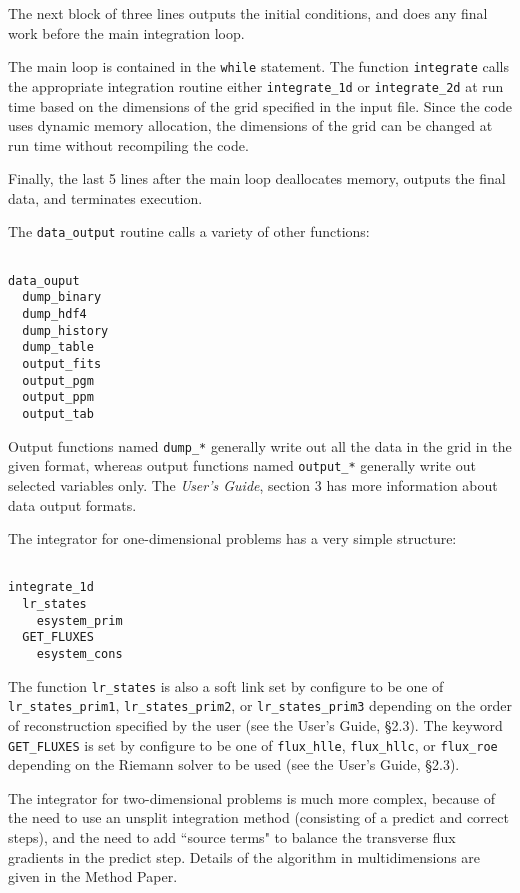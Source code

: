 The next block of three lines outputs the initial conditions, and does any
final work before the main integration loop.

The main loop is contained in the {\tt while} statement.
The function {\tt integrate} calls the appropriate integration routine either
{\tt integrate\_1d} or {\tt integrate\_2d} at run time based on the 
dimensions of the grid specified in the input file.  Since the code uses
dynamic memory allocation, the dimensions of the grid can be changed at run
time without recompiling the code.

Finally, the last 5 lines after the main loop deallocates memory, outputs
the final data, and terminates execution.

The {\tt data\_output} routine calls a variety of other functions:

\footnotesize
\begin{verbatim}

data_ouput
  dump_binary
  dump_hdf4
  dump_history
  dump_table
  output_fits
  output_pgm
  output_ppm
  output_tab

\end{verbatim}
\normalsize

Output functions named {\tt dump\_*} generally write out all the data in the
grid in the given format, whereas output functions named {\tt output\_*}
generally write out selected variables only.
The {\em User's Guide}, section 3 has more information about data output
formats.

The integrator for one-dimensional problems has a very simple structure:

\footnotesize
\begin{verbatim}

integrate_1d
  lr_states
    esystem_prim
  GET_FLUXES
    esystem_cons

\end{verbatim}
\normalsize

The function {\tt lr\_states} is also a soft link set by configure to be one of
{\tt lr\_states\_prim1}, {\tt lr\_states\_prim2}, or {\tt lr\_states\_prim3}
depending on the order of reconstruction specified by the user (see the
User's Guide, \S 2.3).
The keyword {\tt GET\_FLUXES} is set by configure to be one of 
{\tt flux\_hlle}, {\tt flux\_hllc}, or {\tt flux\_roe}
depending on the Riemann solver to be used (see the
User's Guide, \S 2.3).

The integrator for
two-dimensional problems is much more complex, because of the
need to use an unsplit integration method (consisting of a predict and
correct steps), and the need to add ``source terms" to balance the
transverse flux gradients in the predict step.  Details of the
algorithm in multidimensions are given in the Method Paper.

